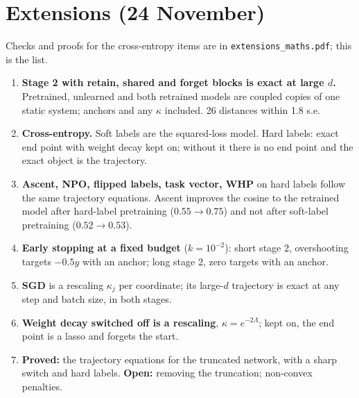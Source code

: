 \documentclass[10pt]{article}
\begin{document}
\section{Extensions (24 November)}
Checks and proofs for the cross-entropy items are in \texttt{extensions\_maths.pdf}; this is the list.
\begin{enumerate}\setlength{\itemsep}{1pt}
\item \textbf{Stage 2 with retain, shared and forget blocks is exact at large $d$.} Pretrained, unlearned and both retrained models are coupled copies of one static system; anchors and any $\kappa$ included. 26 distances within 1.8 s.e.
\item \textbf{Cross-entropy.} Soft labels are the squared-loss model. Hard labels: exact end point with weight decay kept on; without it there is no end point and the exact object is the trajectory.
\item \textbf{Ascent, NPO, flipped labels, task vector, WHP} on hard labels follow the same trajectory equations. Ascent improves the cosine to the retrained model after hard-label pretraining ($0.55\to0.75$) and not after soft-label pretraining ($0.52\to0.53$).
\item \textbf{Early stopping at a fixed budget} ($k=10^{-2}$): short stage 2, overshooting targets $-0.5y$ with an anchor; long stage 2, zero targets with an anchor.
\item \textbf{SGD} is a rescaling $\kappa_j$ per coordinate; its large-$d$ trajectory is exact at any step and batch size, in both stages.
\item \textbf{Weight decay switched off is a rescaling}, $\kappa=e^{-2\Lambda}$; kept on, the end point is a lasso and forgets the start.
\item \textbf{Proved:} the trajectory equations for the truncated network, with a sharp switch and hard labels. \textbf{Open:} removing the truncation; non-convex penalties.
\end{enumerate}
\end{document}
